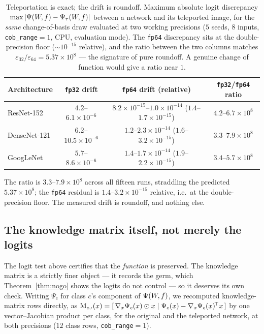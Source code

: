 \begin{table}[t]\centering\small
\caption{Teleportation is exact; the drift is roundoff. Maximum absolute logit
discrepancy $\max|\Psi(W\!,f)-\Psi_\tau(W\!,f)|$ between a network and its teleported image, for the
\emph{same} change-of-basis draw evaluated at two working precisions ($5$ seeds,
$8$ inputs, \texttt{cob\_range}$=1$, CPU, evaluation mode). The \texttt{fp64}
discrepancy sits at the double-precision floor ($\sim10^{-15}$ relative), and the
ratio between the two columns matches
$\varepsilon_{32}/\varepsilon_{64}=5.37\times10^{8}$ --- the signature of pure
roundoff. A genuine change of function would give a ratio near $1$.}
\label{tab:teleport-exactness}
\smallskip
\begin{tabular}{@{}lccc@{}}\toprule
Architecture & \texttt{fp32} drift & \texttt{fp64} drift (relative) & \texttt{fp32}/\texttt{fp64} ratio \\ \midrule
ResNet-152   & $4.2$--$6.1\times10^{-6}$ & $8.2\times10^{-15}$--$1.0\times10^{-14}$ \; ($1.4$--$1.7\times10^{-15}$) & $4.2$--$6.7\times10^{8}$ \\
DenseNet-121 & $6.2$--$10.5\times10^{-6}$ & $1.2$--$2.3\times10^{-14}$ \; ($1.6$--$3.2\times10^{-15}$) & $3.3$--$7.9\times10^{8}$ \\
GoogLeNet    & $5.7$--$8.6\times10^{-6}$ & $1.4$--$1.7\times10^{-14}$ \; ($1.9$--$2.2\times10^{-15}$) & $3.4$--$5.7\times10^{8}$ \\
\bottomrule\end{tabular}\end{table}

The ratio is $3.3$--$7.9\times10^{8}$ across all fifteen runs, straddling the
predicted $5.37\times10^{8}$; the \texttt{fp64} residual is $1.4$--$3.2\times
10^{-15}$ relative, i.e.\ at the double-precision floor. The measured drift is
roundoff, and nothing else.

\subsection{The knowledge matrix itself, not merely the logits}
\label{app:teleport-km}

The logit test above certifies that the \emph{function} is preserved. The
knowledge matrix is a strictly finer object --- it records the germ, which
Theorem~\ref{thm:nogo} shows the logits do not control --- so it deserves its own
check. Writing $\Psi_c$ for class $c$'s component of $\Psi(W\!,f)$, we recomputed
knowledge-matrix rows directly, as
$\mathrm{M}_{c,:}(x)=[\,\nabla_x\Psi_c(x)\odot x \mid \Psi_c(x)-\nabla_x\Psi_c(x)^{\!\top}x\,]$
by one vector--Jacobian product per class, for the original and the teleported
network, at both precisions ($12$ class rows, \texttt{cob\_range}$=1$).

